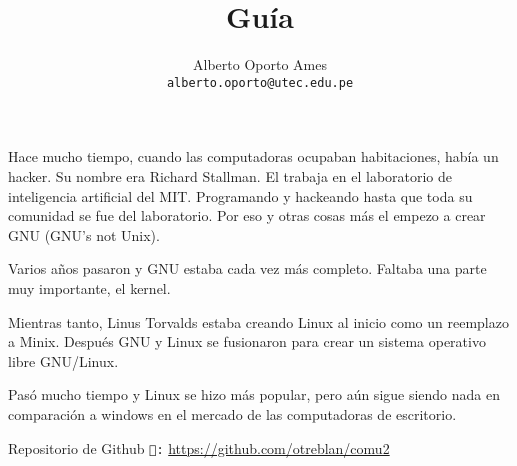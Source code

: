 \documentclass[12pt]{article}
\title{\textbf{Guía}}
\author{
		Alberto Oporto Ames\\
		\texttt{alberto.oporto@utec.edu.pe}
		}
\begin{document}
\maketitle
\thispagestyle{fancy}

Hace mucho tiempo, cuando las computadoras ocupaban habitaciones, había un hacker.
Su nombre era Richard Stallman.
El trabaja en el laboratorio de inteligencia artificial del MIT.
Programando y hackeando hasta que toda su comunidad se fue del laboratorio.
Por eso y otras cosas más el empezo a crear GNU (GNU's not Unix).

Varios años pasaron y GNU estaba cada vez más completo.
Faltaba una parte muy importante, el kernel.

Mientras tanto, Linus Torvalds estaba creando Linux al inicio como un reemplazo a Minix.
Después GNU y Linux se fusionaron para crear un sistema operativo libre GNU/Linux.

Pasó mucho tiempo y Linux se hizo más popular,
pero aún sigue siendo nada en comparación a windows en el mercado de las computadoras de escritorio.

\vfill
Repositorio de Github \texttt{:} \url{https://github.com/otreblan/comu2}
\end{document}
